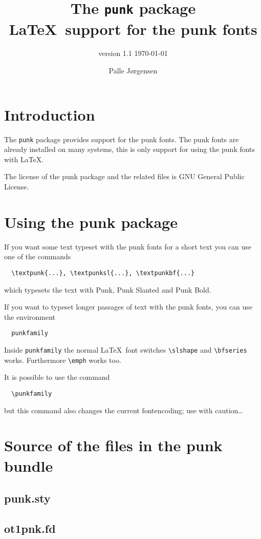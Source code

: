 \documentclass{article}
\title{The \texttt{punk} package\medskip\\
  \large\LaTeX\ support for the punk fonts}
\author{version 1.1 \today}
\date{Palle J\o rgensen}
\begin{document}
\maketitle
\section{Introduction}
\label{sec:introduction}
The \texttt{punk} package provides support for the punk fonts. The
punk fonts are already installed on many systems, this is only support
for using the punk fonts with \LaTeX.

The license of the punk package and the related files is GNU General
Public License.

\section{Using the punk package}
\label{sec:using-punk-fonts}

If you want some text typeset with the punk fonts for a short
text you can use one of the commands

\begin{lstlisting}
  \textpunk{...}, \textpunksl{...}, \textpunkbf{...}
\end{lstlisting}
which typesets the text with Punk, Punk Slanted and Punk Bold.

If you want to typeset longer passages of text with the punk fonts,
you can use the environment

\begin{lstlisting}
  punkfamily
\end{lstlisting}
Inside \texttt{punkfamily} the normal \LaTeX\ font switches
\verb+\slshape+ and \verb+\bfseries+ works. Furthermore \verb+\emph+
works too.

It is possible to use the command
\begin{lstlisting}
  \punkfamily
\end{lstlisting}
but this command also changes the current fontencoding; use with
caution\dots

\clearpage
\appendix
\enlargethispage*{5mm}
\section{Source of the files in the punk bundle}
\label{sec:source}

\subsection{punk.sty}
\label{sec:punk.sty}


\subsection{ot1pnk.fd}
\label{sec:ot1pnr.fd}

\end{document}
